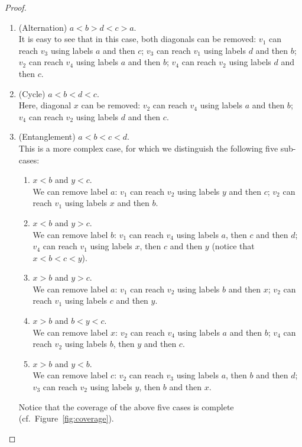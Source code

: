 \documentclass[a4paper,UKenglish]{article}
\begin{document}
\begin{proof}
\begin{enumerate}[label=(\alph*)]
\begin{enumerate}[label=\arabic*.]
\item (Alternation) $a<b>d<c>a$.\\It is easy to see that in this case, both diagonals can be removed: $v_1$ can reach $v_3$ using labels $a$ and then $c$; $v_3$ can reach $v_1$ using labels $d$ and then $b$; $v_2$ can reach $v_4$ using labels $a$ and then $b$; $v_4$ can reach $v_2$ using labels $d$ and then $c$.
\item (Cycle) $a<b<d<c$.\\Here, diagonal $x$ can be removed: $v_2$ can reach $v_4$ using labels $a$ and then $b$; $v_4$ can reach $v_2$ using labels $d$ and then $c$.
\item (Entanglement) $a<b<c<d$.\\This is a more complex case, for which we distinguish the following five sub-cases:
	\begin{enumerate}[label=\roman*)]
	\item $x<b$ and $y<c$.\\We can remove label $a$: $v_1$ can reach $v_2$ using labels $y$ and then $c$; $v_2$ can reach $v_1$ using labels $x$ and then $b$.
	\item $x<b$ and $y>c$.\\We can remove label $b$: $v_1$ can reach $v_4$ using labels $a$, then $c$ and then $d$; $v_4$ can reach $v_1$ using labels $x$, then $c$ and then $y$ (notice that $x<b<c<y$).
	\item $x>b$ and $y>c$.\\We can remove label $a$: $v_1$ can reach $v_2$ using labels $b$ and then $x$; $v_2$ can reach $v_1$ using labels $c$ and then $y$.
	\item $x>b$ and $b<y<c$.\\We can remove label $x$: $v_2$ can reach $v_4$ using labels $a$ and then $b$; $v_4$ can reach $v_2$ using labels $b$, then $y$ and then $c$.
	\item $x>b$ and $y<b$.\\We can remove label $c$: $v_2$ can reach $v_3$ using labels $a$, then $b$ and then $d$; $v_3$ can reach $v_2$ using labels $y$, then $b$ and then $x$.
	\end{enumerate}
	Notice that the coverage of the above five cases is complete (cf.~Figure~\ref{fig:coverage}).
	\begin{figure}[tbh!]
	\centering

	\begin{tikzpicture}[scale=0.4]
	

\end{tikzpicture}
\end{figure}
\end{enumerate}
\end{enumerate}
\end{proof}
\end{document}

